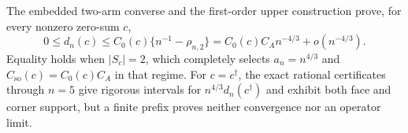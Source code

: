 The embedded two-arm converse and the first-order upper construction prove, for every nonzero zero-sum \(c\),
\[
 0\leq d_n(c)\leq C_0(c)\{n^{-1}-\rho_{n,2}\}
 =C_0(c)C_A n^{-4/3}+o(n^{-4/3}).
\]
Equality holds when \(|S_c|=2\), which completely selects \(a_n=n^{4/3}\) and \(C_{\mathrm{so}}(c)=C_0(c)C_A\) in that regime. For \(c=c^\dagger\), the exact rational certificates through \(n=5\) give rigorous intervals for \(n^{4/3}d_n(c^\dagger)\) and exhibit both face and corner support, but a finite prefix proves neither convergence nor an operator limit.
